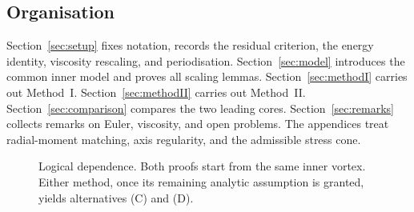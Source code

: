 \subsection{Organisation}
\label{sec:intro-org}

Section~\ref{sec:setup} fixes notation, records the residual criterion, the energy identity, viscosity rescaling, and periodisation. Section~\ref{sec:model} introduces the common inner model and proves all scaling lemmas. Section~\ref{sec:methodI} carries out Method~I. Section~\ref{sec:methodII} carries out Method~II. Section~\ref{sec:comparison} compares the two leading cores. Section~\ref{sec:remarks} collects remarks on {E}uler, viscosity, and open problems. The appendices treat radial-moment matching, axis regularity, and the admissible stress cone.

\begin{figure}[t]
\centering
{}
\caption{Logical dependence. Both proofs start from the same inner vortex. Either method, once its remaining analytic assumption is granted, yields alternatives (C) and (D).}
\label{fig:logic}
\end{figure}
